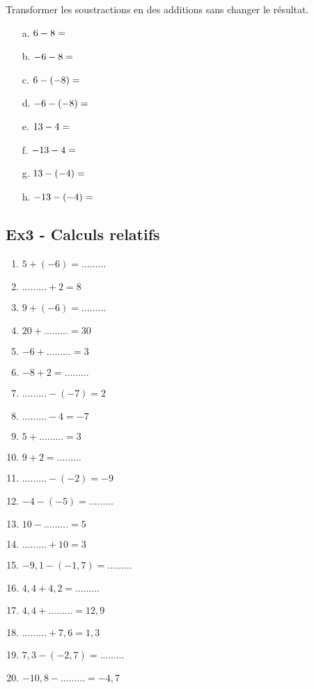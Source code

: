 \documentclass[a4paper,11pt]{article}
\begin{document}
Transformer les soustractions en des additions sans changer le résultat.

\begin{multicols}{2}\noindent
  \begin{enumerate}
    \item[a.] $6 - 8 = \dotfill$
    \item[b.] $-6 - 8 = \dotfill$
    \item[c.] $6 - (-8) = \dotfill$
    \item[d.] $-6 - (-8) = \dotfill$    
    \item[e.] $13 - 4 = \dotfill$
    \item[f.] $-13 - 4 = \dotfill$    
    \item[g.] $13 - (-4) = \dotfill$
    \item[h.] $-13 - (-4) = \dotfill$    

  \end{enumerate}
\end{multicols}

\subsection*{Ex3 - Calculs relatifs}

\begin{multicols}{3}\noindent
  \begin{enumerate}
    \item $5 + \left( -6\right) = \ldots\ldots\ldots$
    \item $\ldots\ldots\ldots + 2 = 8$
    \item $9 + \left( -6\right) = \ldots\ldots\ldots$
    \item $20 + \ldots\ldots\ldots = 30$
    \item $-6 + \ldots\ldots\ldots = 3$
    \item $-8 + 2 = \ldots\ldots\ldots$
    \item $\ldots\ldots\ldots - \left( -7\right) = 2$
    \item $\ldots\ldots\ldots - 4 = -7$
    \item $5 + \ldots\ldots\ldots = 3$
    \item $9 + 2 = \ldots\ldots\ldots$
    \item $\ldots\ldots\ldots - \left( -2\right) = -9$
    \item $-4 - \left( -5\right) = \ldots\ldots\ldots$
    \item $10 - \ldots\ldots\ldots = 5$
    \item $\ldots\ldots\ldots + 10 = 3$
    \item $-9,1 - \left( -1,7\right) = \ldots\ldots\ldots$
    \item $4,4 + 4,2 = \ldots\ldots\ldots$
    \item $4,4 + \ldots\ldots\ldots = 12,9$
    \item $\ldots\ldots\ldots + 7,6 = 1,3$
    \item $7,3 - \left( -2,7\right) = \ldots\ldots\ldots$
    \item $-10,8 - \ldots\ldots\ldots = -4,7$
  \end{enumerate}
\end{multicols}
\end{document}
